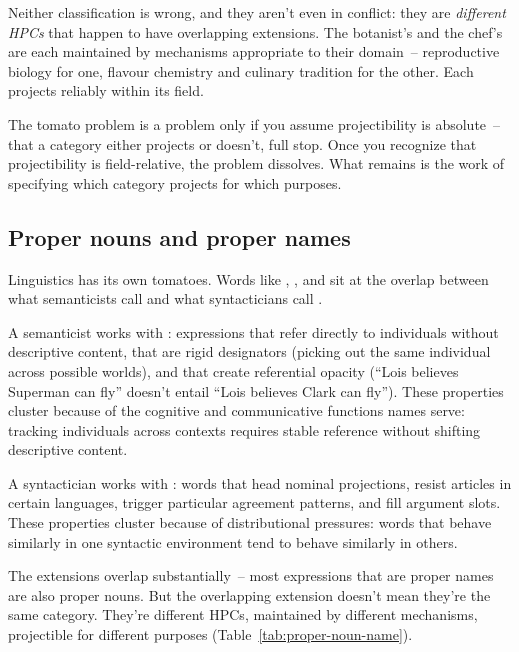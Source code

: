 Neither classification is wrong, and they aren't even in conflict: they are \emph{different HPCs} that happen to have overlapping extensions. The botanist's  and the chef's  are each maintained by mechanisms appropriate to their domain~-- reproductive biology for one, flavour chemistry and culinary tradition for the other. Each projects reliably within its field.

The tomato problem is a problem only if you assume projectibility is absolute~-- that a category either projects or doesn't, full stop. Once you recognize that projectibility is field-relative, the problem dissolves. What remains is the work of specifying which category projects for which purposes.

\subsection{Proper nouns and proper names}
\label{sec:7:proper-nouns-names}

Linguistics has its own tomatoes. Words like , , and  sit at the overlap between what semanticists call  and what syntacticians call .

A semanticist works with : expressions that refer directly to individuals without descriptive content, that are rigid designators (picking out the same individual across possible worlds), and that create referential opacity (\enquote{Lois believes Superman can fly} doesn't entail \enquote{Lois believes Clark can fly}). These properties cluster because of the cognitive and communicative functions names serve: tracking individuals across contexts requires stable reference without shifting descriptive content.

A syntactician works with : words that head nominal projections, resist articles in certain languages, trigger particular agreement patterns, and fill argument slots. These properties cluster because of distributional pressures: words that behave similarly in one syntactic environment tend to behave similarly in others.

The extensions overlap substantially~-- most expressions that are proper names are also proper nouns. But the overlapping extension doesn't mean they're the same category. They're different HPCs, maintained by different mechanisms, projectible for different purposes (Table~\ref{tab:proper-noun-name}).

